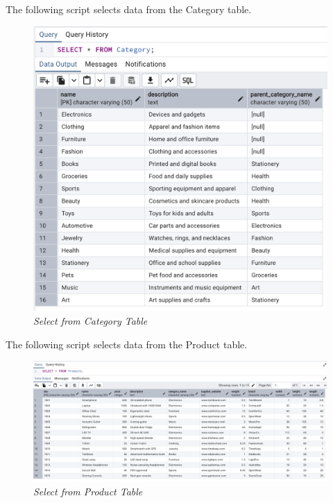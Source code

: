 The following script selects data from the Category table.


\begin{figure}[H]
  \centering
  \includegraphics[width=1\textwidth]{images/sql/select/category.png}
  \caption{\textit{Select from Category Table}}
\end{figure}

The following script selects data from the Product table.


\begin{figure}[H]
  \centering
  \includegraphics[width=1\textwidth]{images/sql/select/product.png}
  \caption{\textit{Select from Product Table}}
\end{figure}

